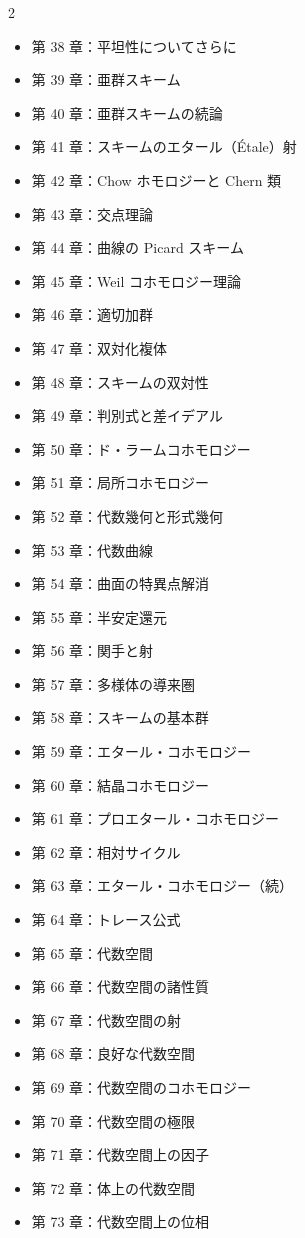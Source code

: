 \begin{multicols}{2}
\begin{itemize}
\item 第 38 章：平坦性についてさらに
\item 第 39 章：亜群スキーム
\item 第 40 章：亜群スキームの続論
\item 第 41 章：スキームのエタール（\'Etale）射
\item 第 42 章：Chow ホモロジーと Chern 類
\item 第 43 章：交点理論
\item 第 44 章：曲線の Picard スキーム
\item 第 45 章：Weil コホモロジー理論
\item 第 46 章：適切加群
\item 第 47 章：双対化複体
\item 第 48 章：スキームの双対性
\item 第 49 章：判別式と差イデアル
\item 第 50 章：ド・ラームコホモロジー
\item 第 51 章：局所コホモロジー
\item 第 52 章：代数幾何と形式幾何
\item 第 53 章：代数曲線
\item 第 54 章：曲面の特異点解消
\item 第 55 章：半安定還元
\item 第 56 章：関手と射
\item 第 57 章：多様体の導来圏
\item 第 58 章：スキームの基本群
\item 第 59 章：エタール・コホモロジー
\item 第 60 章：結晶コホモロジー
\item 第 61 章：プロエタール・コホモロジー
\item 第 62 章：相対サイクル
\item 第 63 章：エタール・コホモロジー（続）
\item 第 64 章：トレース公式
\item 第 65 章：代数空間
\item 第 66 章：代数空間の諸性質
\item 第 67 章：代数空間の射
\item 第 68 章：良好な代数空間
\item 第 69 章：代数空間のコホモロジー
\item 第 70 章：代数空間の極限
\item 第 71 章：代数空間上の因子
\item 第 72 章：体上の代数空間
\item 第 73 章：代数空間上の位相

\end{itemize}
\end{multicols}
